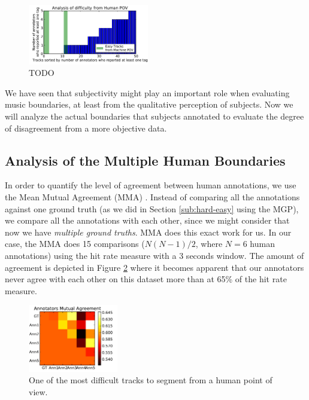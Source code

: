 \documentclass{article}
\begin{document}
\begin{figure}
  \centering
  \includegraphics[width=0.47\textwidth]{plots/difficulty-human.pdf}
  \caption{TODO}
  \label{fig:difficulty-human}
\end{figure}%



We have seen that subjectivity might play an important role when evaluating music boundaries, at least from the qualitative perception of subjects.
Now we will analyze the actual boundaries that subjects annotated to evaluate the degree of disagreement from a more objective data.

\subsection{Analysis of the Multiple Human Boundaries}

In order to quantify the level of agreement between human annotations, we use the Mean Mutual Agreement (MMA) \cite{Holzapfel2012}.
Instead of comparing all the annotations against one ground truth (as we did in Section \ref{sub:hard-easy} using the MGP), we compare all the annotations with each other, since we might consider that now we have \textit{multiple ground truths}.
MMA does this exact work for us.
In our case, the MMA does 15 comparisons ($N(N-1)/2$, where $N=6$ human annotations) using the hit rate measure with a 3 seconds window.
The amount of agreement is depicted in Figure \ref{fig:annot-agreement} where it becomes apparent that our annotators never agree with each other on this dataset more than at 65\% of the hit rate measure.

\begin{figure}
  \centering
  \includegraphics[width=0.35\textwidth]{plots/annot-agreement.pdf}
  \caption{One of the most difficult tracks to segment from a human point of view.}
  \label{fig:annot-agreement}
\end{figure}%
\end{document}
